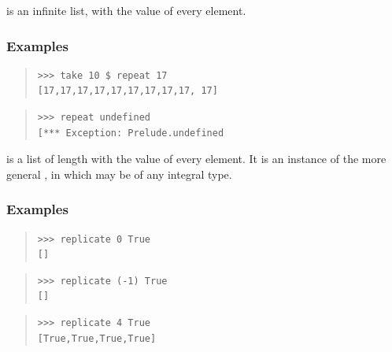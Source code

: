 \begin{haddockdesc}
\item[\begin{tabular}{@{}l}
repeat :: a -> {\char 91}a{\char 93}
\end{tabular}]
{\haddockbegindoc
{}  is an infinite list, with  the value of every element.\par
\subsubsection*{\textbf{Examples}}
\begin{quote}
{\haddockverb\begin{verbatim}
>>> take 10 $ repeat 17
[17,17,17,17,17,17,17,17,17, 17]

\end{verbatim}}
\end{quote}
\begin{quote}
{\haddockverb\begin{verbatim}
>>> repeat undefined
[*** Exception: Prelude.undefined

\end{verbatim}}
\end{quote}}
\end{haddockdesc}
\begin{haddockdesc}
\item[\begin{tabular}{@{}l}
replicate :: Int -> a -> {\char 91}a{\char 93}
\end{tabular}]
{\haddockbegindoc
{}  is a list of length  with  the value of
 every element.
 It is an instance of the more general ,
 in which  may be of any integral type.\par
\subsubsection*{\textbf{Examples}}
\begin{quote}
{\haddockverb\begin{verbatim}
>>> replicate 0 True
[]

\end{verbatim}}
\end{quote}
\begin{quote}
{\haddockverb\begin{verbatim}
>>> replicate (-1) True
[]

\end{verbatim}}
\end{quote}
\begin{quote}
{\haddockverb\begin{verbatim}
>>> replicate 4 True
[True,True,True,True]

\end{verbatim}}
\end{quote}}
\end{haddockdesc}
